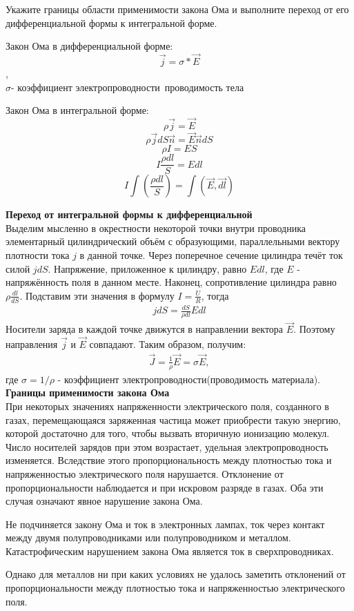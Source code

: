 \documentclass[__main__.tex]{subfiles}
\begin{document}
Укажите границы области применимости закона Ома и выполните переход от его дифференциальной формы к интегральной форме.\\ 

\begin{definition}
	Закон Ома в дифференциальной форме:
	$$\vec{j}=σ*\vec{E}$$,
	\\$σ$- коэффициент электропроводности\ проводимость тела
\end{definition}
\begin{definition}
	Закон Ома в интегральной форме:
	$$ρ\vec{j}=\vec{E}$$
	$$ρ\vec{j}dS\vec{n}=\vec{E}\vec{n}dS$$
	$$ρI=ES$$
	$$I\frac{ρdl}{S}=Edl$$
	$$I\int(\frac{ρdl}{S})=\int(\vec{E},\vec{dl})$$
\end{definition}
\textbf{Переход от интегральной формы к дифференциальной}\\
Выделим мысленно в окрестности некоторой точки внутри проводника элементарный цилиндрический объём с образующими, параллельными вектору плотности тока $j$ в данной  точке. Через поперечное сечение цилиндра течёт ток силой $jdS$. Напряжение, приложенное к цилиндру, равно $Edl$, где $E$ - напряжённость поля в данном месте. Наконец, сопротивление цилиндра равно $\rho\frac{dl}{dS}$. Подставим эти значения в формулу $I = \frac{U}{R}$, тогда
\begin{gather*}
jdS = \frac{dS}{\rho dl}Edl
\end{gather*}
Носители заряда в каждой точке движутся в направлении вектора $\vec{E}$. Поэтому направления $\vec{j}$ и $\vec{E}$ совпадают. Таким образом, получим:
\begin{gather*}
\vec{J} = \frac{1}{\rho}\vec{E} = \sigma \vec{E},
\end{gather*}
где $\sigma = 1/\rho$ - коэффициент электропроводности(проводимость материала).\\
\textbf{Границы применимости закона Ома}\\
При некоторых значениях напряженности электрического поля, созданного в газах, перемещающаяся заряженная частица может приобрести такую энергию, которой достаточно для того, чтобы вызвать вторичную ионизацию молекул. Число носителей зарядов при этом возрастает, удельная электропроводность изменяется. Вследствие этого пропорциональность между плотностью тока и напряженностью электрического поля нарушается. Отклонение от пропорциональности наблюдается и при искровом разряде в газах. Оба эти случая означают явное нарушение закона Ома.

Не подчиняется закону Ома и ток в электронных лампах, ток через контакт между двумя полупроводниками или полупроводником и металлом. Катастрофическим нарушением закона Ома является ток в сверхпроводниках.

Однако для металлов ни при каких условиях не удалось заметить отклонений от пропорциональности между плотностью тока и напряженностью электрического поля.
\end{document}
